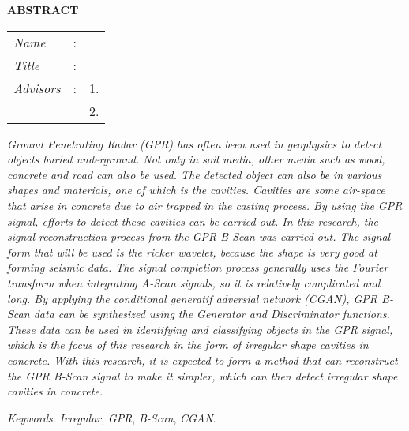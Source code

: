 \begin{center}
  \large\textbf{ABSTRACT}
\end{center}


\vspace{2ex}

\begingroup
\setlength{\tabcolsep}{0pt}

\noindent
\begin{tabularx}{\textwidth}{l >{\centering}m{3em} X}
  \emph{Name}     & : & \name{}         \\

  \emph{Title}    & : & \engtatitle{}   \\

  \emph{Advisors} & : & 1. \advisor{}   \\
                  &   & 2. \coadvisor{} \\
\end{tabularx}
\endgroup

\emph{Ground Penetrating Radar (GPR) has often been used in geophysics to detect objects buried underground. 
Not only in soil media, other media such as wood, concrete and road can also be used. 
The detected object can also be in various shapes and materials, one of which is the cavities. 
Cavities are some air-space that arise in concrete due to air trapped in the casting process. 
By using the GPR signal, efforts to detect these cavities can be carried out. 
In this research, the signal reconstruction process from the GPR B-Scan was carried out. 
The signal form that will be used is the ricker wavelet, because the shape is very good at forming seismic data. 
The signal completion process generally uses the Fourier transform when integrating A-Scan signals, so it is relatively complicated and long. 
By applying the conditional generatif adversial network (CGAN), GPR B-Scan data can be synthesized using the Generator and Discriminator functions. 
These data can be used in identifying and classifying objects in the GPR signal, which is the focus of this research in the form of irregular shape cavities in concrete. 
With this research, it is expected to form a method that can reconstruct the GPR B-Scan signal to make it simpler, which can then detect irregular shape cavities in concrete.}

\emph{Keywords}: \emph{Irregular}, \emph{GPR}, \emph{B-Scan}, \emph{CGAN}.
